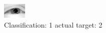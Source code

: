 \begin{figure}[h!]
\begin{center}
\includegraphics[width=0.60\columnwidth]{figures/ID2237_class_1_target_2.png}
\end{center}
\caption{ Classification: 1 actual target: 2}
\label{fig:ID2237_class_1_target_2}
\end{figure}
